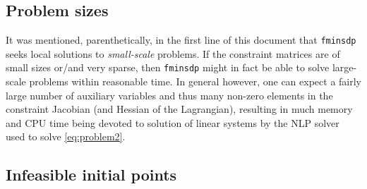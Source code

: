 \documentclass{article}
\begin{document}

\subsection{Problem sizes}

It was mentioned, parenthetically, in the first line of this document that \texttt{fminsdp} seeks local solutions to \textit{small-scale} problems. If the constraint matrices are of small sizes or/and very sparse, then \texttt{fminsdp}
might in fact be able to solve large-scale problems within reasonable time. In general however, one can expect a fairly large
number of auxiliary variables and thus many non-zero elements in the constraint Jacobian (and Hessian of the Lagrangian), resulting
in much memory and CPU time being devoted to solution of linear systems by the NLP solver used to solve \eqref{eq:problem2}.

 


\subsection{Infeasible initial points}
\end{document}
